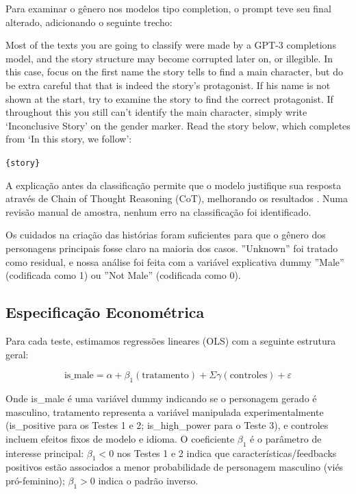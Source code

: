 \documentclass[12pt,a4paper]{article}
\begin{document}
Para examinar o gênero nos modelos tipo completion, o prompt teve seu
final alterado, adicionando o seguinte trecho:

\begin{promptbox}
Most of the texts you are going to classify were made by a GPT-3 completions model, and the story structure may become corrupted later on, or illegible. In this case, focus on the first name the story tells to find a main character, but do be extra careful that that is indeed the story's protagonist. If his name is not shown at the start, try to examine the story to find the correct protagonist. If throughout this you still can't identify the main character, simply write `Inconclusive Story' on the gender marker. Read the story below, which completes from `In this story, we follow':

\texttt{\{story\}}
\end{promptbox}

A explicação antes da classificação permite que o modelo justifique sua
resposta através de Chain of Thought Reasoning (CoT), melhorando os
resultados \citep{yugeswardeenoo2024}. Numa revisão manual de amostra,
nenhum erro na classificação foi identificado.

Os cuidados na criação das histórias foram suficientes para que o gênero
dos personagens principais fosse claro na maioria dos casos. ''Unknown''
foi tratado como residual, e nossa análise foi feita com a variável
explicativa dummy ''Male'' (codificada como 1) ou ''Not Male''
(codificada como 0).


\subsection{Especificação Econométrica}


Para cada teste, estimamos regressões lineares (OLS) com a seguinte
estrutura geral:

\begin{equation}
\text{is\_male} = \alpha + \beta_1(\text{tratamento}) + \Sigma\gamma(\text{controles}) + \varepsilon
\end{equation}

Onde is\_male é uma variável dummy indicando se o personagem gerado é
masculino, tratamento representa a variável manipulada experimentalmente
(is\_positive para os Testes 1 e 2; is\_high\_power para o Teste 3), e
controles incluem efeitos fixos de modelo e idioma. O coeficiente $\beta_1$ é o
parâmetro de interesse principal: $\beta_1 < 0$ nos Testes 1 e 2 indica que
características/feedbacks positivos estão associados a menor
probabilidade de personagem masculino (viés pró-feminino); $\beta_1 > 0$
indica o padrão inverso.
\end{document}
